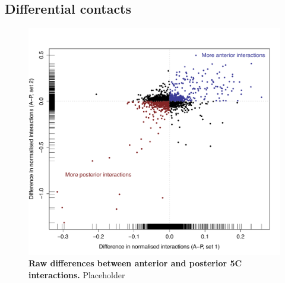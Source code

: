 \documentclass[a4paper,10pt,oneside]{book}
\begin{document}


\subsection{Differential contacts}


\begin{figure}
\begin{center} 
\includegraphics[width=\textwidth]{figs/5cfc.pdf}
\captionsetup{width=\textwidth} 
\caption[Raw differences between anterior and posterior 5C interactions.]{ {\bf Raw differences between anterior and posterior 5C interactions. }
Placeholder
}\label{fig:5cfc}
\end{center} 
\end{figure} 

\end{document}
